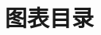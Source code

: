 \section{图表目录}
\label{app:catalog}
\begingroup
  \renewcommand{\listfigurename}{插图}
  \renewcommand{\listtablename}{表格}
  \renewcommand{\listalgorithmname}{算法}
  \listoffigures
  \listoftables
  \listofalgorithms
\endgroup




